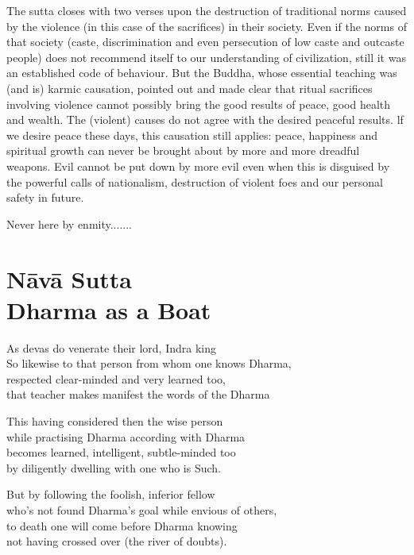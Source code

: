 The sutta closes with two verses upon the destruction of traditional norms caused by the violence (in this case of the sacrifices) in their society. Even if the norms of that society (caste, discrimination and even persecution of low caste and outcaste people) does not recommend itself to our understanding of civilization, still it was an established code of behaviour. But the Buddha, whose essential teaching was (and is) karmic causation, pointed out and made clear that ritual sacrifices involving violence cannot possibly bring the good results of peace, good health and wealth. The (violent) causes do not agree with the desired peaceful results. lf we desire peace these days, this causation still applies: peace, happiness and spiritual growth can never be brought about by more and more dreadful weapons. Evil cannot be put down by more evil even when this is disguised by the powerful calls of nationalism, destruction of violent foes and our personal safety in future. 

\begin{MyDescription}[]{}
Never here by enmity.......
\end{MyDescription}

\chapter{N\=av\=a Sutta\\ Dharma as a Boat}


 \begin{MyDescription}{}
 As devas do venerate their lord, Indra king\\
 So likewise to that person from whom one knows Dharma,\\
 respected clear-minded and very learned too,\\
 that teacher makes manifest the words of the Dharma
 \end{MyDescription}
 
\begin{MyDescription}{}
This having considered then the wise person\\
while practising Dharma according with Dharma\\
becomes learned, intelligent, subtle-minded too\\
by diligently dwelling with one who is Such.
\end{MyDescription}

\begin{MyDescription}{}
But by following the foolish, inferior fellow\\
who's not found Dharma's goal while envious of others,\\
to death one will come before Dharma knowing\\
not having crossed over (the river of doubts).
\end{MyDescription}

